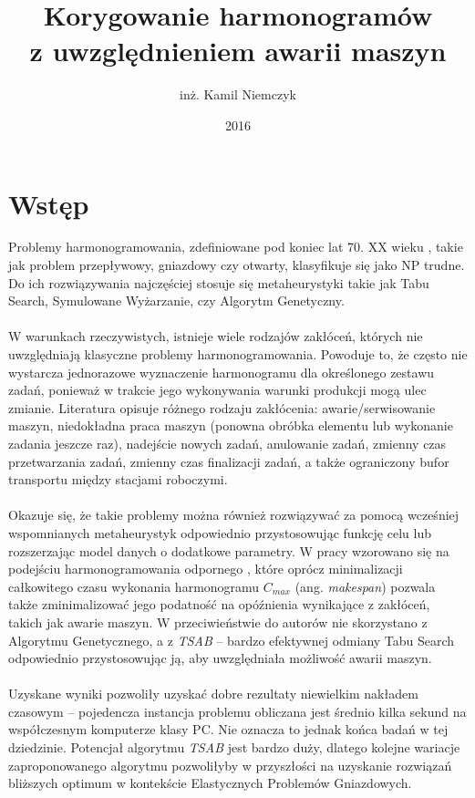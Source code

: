 \documentclass[printmode,oneside]{mgr}
\title{Korygowanie harmonogramów\\ z uwzględnieniem awarii maszyn}
\author{inż. Kamil Niemczyk}
\date{2016} %
\begin{document}

\maketitle %
\cleardoublepage
\tableofcontents %
\cleardoublepage
%
%
%
%
\chapter*{Wstęp}
Problemy harmonogramowania, zdefiniowane pod koniec lat 70. XX wieku \cite{Garey76}, takie jak problem przepływowy, gniazdowy czy otwarty, klasyfikuje się jako NP trudne. Do ich rozwiązywania najczęściej stosuje się metaheurystyki takie jak Tabu Search, Symulowane Wyżarzanie, czy Algorytm Genetyczny.\\\\
W warunkach rzeczywistych, istnieje wiele rodzajów zakłóceń, których nie uwzględniają klasyczne problemy harmonogramowania. Powoduje to, że często nie wystarcza jednorazowe wyznaczenie harmonogramu dla określonego zestawu zadań, ponieważ w trakcie jego wykonywania warunki produkcji mogą ulec zmianie. Literatura opisuje różnego rodzaju zakłócenia: awarie/serwisowanie maszyn, niedokładna praca maszyn (ponowna obróbka elementu lub wykonanie zadania jeszcze raz), nadejście nowych zadań, anulowanie zadań, zmienny czas przetwarzania zadań, zmienny czas finalizacji zadań, a także ograniczony bufor transportu między stacjami roboczymi.\\\\
Okazuje się, że takie problemy można również rozwiązywać za pomocą wcześniej wspomnianych metaheurystyk odpowiednio przystosowując funkcję celu lub rozszerzając model danych o dodatkowe parametry. W pracy wzorowano się na podejściu harmonogramowania odpornego \cite{RFJSRMB_ElMekkawy11}, które oprócz minimalizacji całkowitego czasu wykonania harmonogramu $C_{max}$ (ang. \emph{makespan}) pozwala także zminimalizować jego podatność na opóźnienia wynikające z zakłóceń, takich jak awarie maszyn.  W przeciwieństwie do autorów \cite{RFJSRMB_ElMekkawy11} nie skorzystano z Algorytmu Genetycznego, a z \emph{TSAB} \cite{Smutnicki96} -- bardzo efektywnej odmiany Tabu Search odpowiednio przystosowując ją, aby uwzględniała możliwość awarii maszyn.\\\\
Uzyskane wyniki pozwoliły uzyskać dobre rezultaty niewielkim nakładem czasowym -- pojedencza instancja problemu obliczana jest średnio kilka sekund na współczesnym komputerze klasy PC. Nie oznacza to jednak końca badań w tej dziedzinie. Potencjał algorytmu \emph{TSAB} jest bardzo duży, dlatego kolejne wariacje zaproponowanego algorytmu pozwoliłyby w przyszłości na uzyskanie rozwiązań bliższych optimum w kontekście Elastycznych Problemów Gniazdowych.
%
\end{document}
